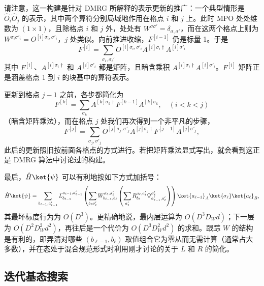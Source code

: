请注意，这一构建是针对 DMRG 所解释的表示更新的推广：一个典型情形是 $\hat{O}_i \hat{O}_j$ 的表示，其中两个算符分别局域地作用在格点 $i$ 和 $j$ 上。此时 MPO 处处维数为 $(1\times 1)$，且除格点 $i$ 和 $j$ 外，处处有 $W^{\sigma\sigma'} = \delta_{\sigma,\sigma'}$，而在这两个格点上则为 $W^{\sigma_i\sigma'_i} = O^{[i]\sigma_i,\sigma'_i}$，$j$ 处类似。向前推进收缩，$F^{[i-1]}$ 仍是标量 1。于是
\begin{equation}
F^{[i]} =  \sum_{\sigma_i,\sigma_i'} O^{[i]\sigma_i,\sigma'_i} A^{[i]\sigma_i\dagger} A^{[i]\sigma'_i}
\end{equation}
其中 $F^{[i]}$、$A^{[i]\sigma_i\dagger}$ 和 $A^{[i]\sigma'_i}$ 都是矩阵，且暗含乘积 $A^{[i]\sigma_i\dagger} A^{[i]\sigma'_i}$。$F^{[i]}$ 矩阵正是涵盖格点 1 到 $i$ 的块基中的算符表示。

更新到格点 $j-1$ 之前，各步都简化为
\begin{equation}
F^{[k]} =  \sum_{\sigma_k} A^{[k]\sigma_k\dagger} F^{[k-1]} A^{[k]\sigma_k} ,\quad (i<k<j)
\end{equation}
（暗含矩阵乘法），而在格点 $j$ 处我们再次得到一个非平凡的步骤，
\begin{equation}
F^{[j]} = \sum_{\sigma_j,\sigma'_j} O^{[j]\sigma_j,\sigma'_j} A^{[j]\sigma_j\dagger} F^{[j-1]} A^{[j]\sigma'_j},
\end{equation}
此后的更新照旧按前面各格点的方式进行。若把矩阵乘法显式写出，就会看到这正是 DMRG 算法中讨论过的构建。
  
最后，$\hat{H}\ket{\psi}$ 可以有利地按如下方式加括号：
\begin{equation}
\hat{H}\ket{\psi} = \sum_{b_{\ell-1}, a'_{\ell-1}} 
 L^{a_{\ell-1},a'_{\ell-1}}_{b_{\ell-1}} 
\left( \sum_{b_{\ell} \sigma'_{\ell}} 
W^{\sigma_{\ell},\sigma'_{\ell}}_{b_{\ell-1},b_{\ell}}
 \left( \sum_{a'_{\ell}} R^{a_{\ell},a'_{\ell}}_{b_{\ell}} \Psi^{\sigma'_{\ell}}_{a'_{\ell-1},a'_{\ell}} \right) \right) \ket{a_{\ell-1}}_A \ket{\sigma_{\ell}} \ket{a_{\ell}}_B ,
\end{equation}
其最坏标度行为为 $O(D^3)$。更精确地说，最内层运算为 $O(D^3 D_W d)$；下一层为 $O(D^2 D_W^2 d^2)$，再往后是一个代价为 $O(D^3 D_W^2 d^2)$ 的求和。跟踪 $W$ 的结构是有利的，即弄清对哪些 $(b_{\ell-1},b_{\ell})$ 取值组合它为零从而无需计算（通常占大多数），并在态处于混合规范形式时利用刚才讨论的关于 $L$ 和 $R$ 的简化。
 
\subsection{迭代基态搜索}

